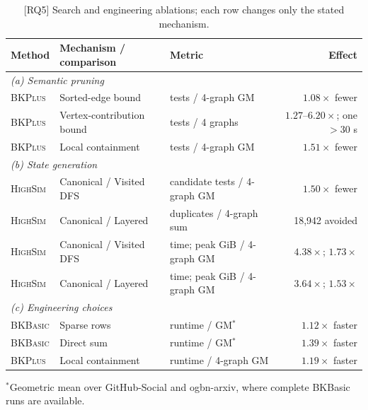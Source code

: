 \documentclass[sigconf, nonacm]{acmart}
\begin{document}
\begin{table}[h]
\scriptsize
\centering
\caption{[RQ5] Search and engineering ablations; each row changes only the stated mechanism.}
\label{tab:ablation}
\setlength{\tabcolsep}{2.2pt}
\begin{tabular*}{\linewidth}{@{\extracolsep{\fill}}lllr@{}}
\toprule
Method & Mechanism / comparison & Metric & Effect \\
\midrule
\multicolumn{4}{l}{\emph{(a) Semantic pruning}} \\
\textsc{BKPlus} & Sorted-edge bound & tests / 4-graph GM & $1.08\times$ fewer \\
\textsc{BKPlus} & Vertex-contribution bound & tests / 4 graphs & $1.27$--$6.20\times$; one $>30$ s \\
\textsc{BKPlus} & Local containment & tests / 4-graph GM & $1.51\times$ fewer \\
\midrule
\multicolumn{4}{l}{\emph{(b) State generation}} \\
\textsc{HighSim} & Canonical / Visited DFS & candidate tests / 4-graph GM & $1.50\times$ fewer \\
\textsc{HighSim} & Canonical / Layered & duplicates / 4-graph sum & 18,942 avoided \\
\textsc{HighSim} & Canonical / Visited DFS & time; peak GiB / 4-graph GM & $4.38\times$; $1.73\times$ \\
\textsc{HighSim} & Canonical / Layered & time; peak GiB / 4-graph GM & $3.64\times$; $1.53\times$ \\
\midrule
\multicolumn{4}{l}{\emph{(c) Engineering choices}} \\
\textsc{BKBasic} & Sparse rows & runtime / GM$^\ast$ & $1.12\times$ faster \\
\textsc{BKBasic} & Direct sum & runtime / GM$^\ast$ & $1.39\times$ faster \\
\textsc{BKPlus} & Local containment & runtime / 4-graph GM & $1.19\times$ faster \\
\bottomrule
\end{tabular*}
\vspace{1pt}\parbox{\linewidth}{\scriptsize $^\ast$Geometric mean over GitHub-Social and ogbn-arxiv, where complete BKBasic runs are available.}
\end{table}
\end{document}

